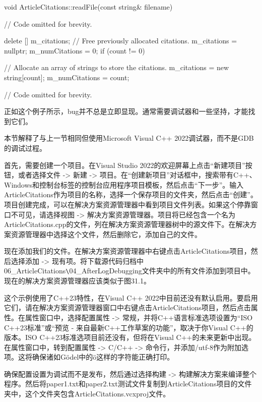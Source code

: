 \begin{cpp}
void ArticleCitations::readFile(const string& filename)
{
    // Code omitted for brevity.

    delete [] m_citations; // Free previously allocated citations.
    m_citations = nullptr;
    m_numCitations = 0;
    if (count != 0) {
        // Allocate an array of strings to store the citations.
        m_citations = new string[count];
        m_numCitations = count;

        // Code omitted for brevity.
    }
}
\end{cpp}

正如这个例子所示，bug并不总是立即显现。通常需要调试器和一些坚持，才能找到它们。


本节解释了与上一节相同但使用Microsoft Visual C++ 2022调试器，而不是GDB的调试过程。

首先，需要创建一个项目。在Visual Studio 2022的欢迎屏幕上点击“新建项目”按钮，或者选择文件 -> 新建 -> 项目。在“创建新项目”对话框中，搜索带有C++、Windows和控制台标签的控制台应用程序项目模板，然后点击“下一步”。输入ArticleCitations作为项目的名称，选择一个保存项目的文件夹，然后点击“创建”。项目创建完成，可以在解决方案资源管理器中看到项目文件列表。如果这个停靠窗口不可见，请选择视图 -> 解决方案资源管理器。项目将已经包含一个名为ArticleCitations.cpp的文件，列在解决方案资源管理器树中的源文件下。在解决方案资源管理器中选择这个文件，然后删除它，添加自己的文件。

现在添加我们的文件。在解决方案资源管理器中右键点击ArticleCitations项目，然后选择添加 -> 现有项。将下载源代码归档中06\_ArticleCitations\verb|\|04\_AfterLogDebugging文件夹中的所有文件添加到项目中。现在的解决方案资源管理器应该类似于图31.1。


这个示例使用了C++23特性，在Visual C++ 2022中目前还没有默认启用。要启用它们，请在解决方案资源管理器窗口中右键点击ArticleCitations项目，然后点击属性。在属性窗口中，选择配置属性 -> 常规，并将C++语言标准选项设置为“ISO C++23标准”或“预览 - 来自最新C++工作草案的功能”，取决于你Visual C++的版本。ISO C++23标准选项目前还没有，但将在Visual C++的未来更新中出现。在属性窗口中，转到配置属性 -> C/C++ -> 命令行，并添加/utf-8作为附加选项。这将确保诸如Gödel中的ö这样的字符能正确打印。

确保配置设置为调试而不是发布，然后通过选择构建 -> 构建解决方案来编译整个程序。然后将paper1.txt和paper2.txt测试文件复制到ArticleCitations项目的文件夹中，这个文件夹包含ArticleCitations.vcxproj文件。

